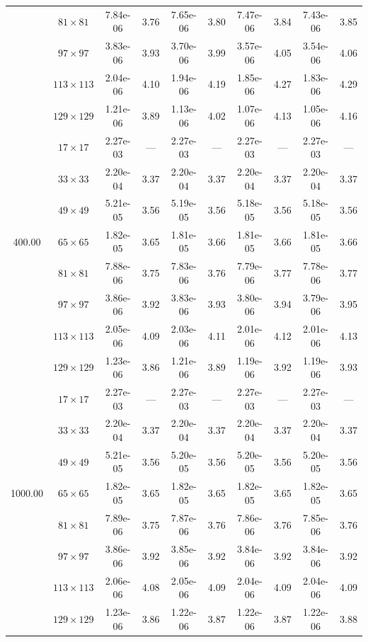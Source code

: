 \documentclass[preprint, 12pt]{elsarticle}
\begin{document}
\begin{center}
\begin{table}[H]
{\begin{tabular*}{\textwidth}{@{\extracolsep\fill}cccccccccc@{}}
    & $81\times 81$ & 7.84e-06 & 3.76 & 7.65e-06 & 3.80 & 7.47e-06 & 3.84 & 7.43e-06 & 3.85 \\
    & $97\times 97$ & 3.83e-06 & 3.93 & 3.70e-06 & 3.99 & 3.57e-06 & 4.05 & 3.54e-06 & 4.06 \\
    & $113\times 113$ & 2.04e-06 & 4.10 & 1.94e-06 & 4.19 & 1.85e-06 & 4.27 & 1.83e-06 & 4.29 \\
    & $129\times 129$ & 1.21e-06 & 3.89 & 1.13e-06 & 4.02 & 1.07e-06 & 4.13 & 1.05e-06 & 4.16 \\
    \hline\hline
    \multirow{7}{*}{400.00} & $17\times 17$ & 2.27e-03 & --- & 2.27e-03 & --- & 2.27e-03 & --- & 2.27e-03 & --- \\
    & $33\times 33$ & 2.20e-04 & 3.37 & 2.20e-04 & 3.37 & 2.20e-04 & 3.37 & 2.20e-04 & 3.37 \\
    & $49\times 49$ & 5.21e-05 & 3.56 & 5.19e-05 & 3.56 & 5.18e-05 & 3.56 & 5.18e-05 & 3.56 \\
    & $65\times 65$ & 1.82e-05 & 3.65 & 1.81e-05 & 3.66 & 1.81e-05 & 3.66 & 1.81e-05 & 3.66 \\
    & $81\times 81$ & 7.88e-06 & 3.75 & 7.83e-06 & 3.76 & 7.79e-06 & 3.77 & 7.78e-06 & 3.77 \\
    & $97\times 97$ & 3.86e-06 & 3.92 & 3.83e-06 & 3.93 & 3.80e-06 & 3.94 & 3.79e-06 & 3.95 \\
    & $113\times 113$ & 2.05e-06 & 4.09 & 2.03e-06 & 4.11 & 2.01e-06 & 4.12 & 2.01e-06 & 4.13 \\
    & $129\times 129$ & 1.23e-06 & 3.86 & 1.21e-06 & 3.89 & 1.19e-06 & 3.92 & 1.19e-06 & 3.93 \\
    \hline\hline
    \multirow{7}{*}{1000.00} & $17\times 17$ & 2.27e-03 & --- & 2.27e-03 & --- & 2.27e-03 & --- & 2.27e-03 & --- \\
    & $33\times 33$ & 2.20e-04 & 3.37 & 2.20e-04 & 3.37 & 2.20e-04 & 3.37 & 2.20e-04 & 3.37 \\
    & $49\times 49$ & 5.21e-05 & 3.56 & 5.20e-05 & 3.56 & 5.20e-05 & 3.56 & 5.20e-05 & 3.56 \\
    & $65\times 65$ & 1.82e-05 & 3.65 & 1.82e-05 & 3.65 & 1.82e-05 & 3.65 & 1.82e-05 & 3.65 \\
    & $81\times 81$ & 7.89e-06 & 3.75 & 7.87e-06 & 3.76 & 7.86e-06 & 3.76 & 7.85e-06 & 3.76 \\
    & $97\times 97$ & 3.86e-06 & 3.92 & 3.85e-06 & 3.92 & 3.84e-06 & 3.92 & 3.84e-06 & 3.92 \\
    & $113\times 113$ & 2.06e-06 & 4.08 & 2.05e-06 & 4.09 & 2.04e-06 & 4.09 & 2.04e-06 & 4.09 \\
    & $129\times 129$ & 1.23e-06 & 3.86 & 1.22e-06 & 3.87 & 1.22e-06 & 3.87 & 1.22e-06 & 3.88 \\
    \hline
    \end{tabular*}
}
\end{table}
\end{center}
\end{document}
